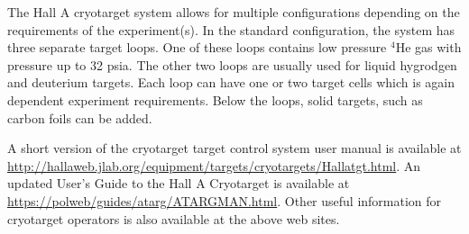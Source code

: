 

The Hall A cryotarget system allows for multiple configurations depending
on the requirements of the experiment(s). In the standard configuration,
the system has three separate target loops. One of these loops contains
low pressure $^{4}$He gas with pressure up to 32 psia. The other
two loops are usually used for liquid hygrodgen and deuterium targets.
Each loop can have one or two target cells which is again dependent
experiment requirements.   Below the loops, solid targets, such as carbon foils
can be added.   

A short version of the cryotarget target control system user manual
is available at \url{http://hallaweb.jlab.org/equipment/targets/cryotargets/Hallatgt.html}.
An updated User's Guide to the Hall A Cryotarget is available at \url{https://polweb/guides/atarg/ATARGMAN.html}.
Other useful information for cryotarget operators is also available
at the above web sites.

